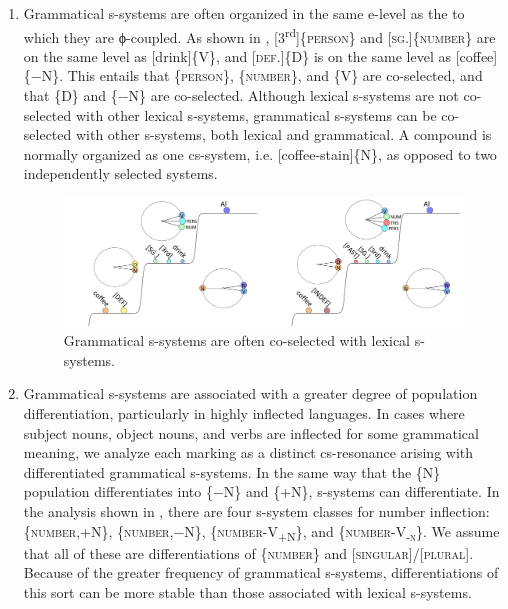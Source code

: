 \begin{enumerate}
\item Grammatical s-systems are often organized in the same e-level as the  to which they are ϕ-coupled. As shown in {}, [3\textsuperscript{rd}]\{\textsc{person}\} and [\textsc{sg.}]\{\textsc{number}\} are on the same level as [drink]\{V\}, and [\textsc{def}.]\{D\} is on the same level as [coffee]\{−N\}. This entails that \{\textsc{person}\}, \{\textsc{number}\}, and \{V\} are co-selected, and that \{D\} and \{−N\} are co-selected. Although lexical s-systems are not co-selected with other lexical s-systems, grammatical s-systems can be co-selected with other s-systems, both lexical and grammatical. A compound  is normally organized as one cs-system, i.e. [coffee-stain]\{N\}, as opposed to two independently selected systems.

  
\begin{figure}
\includegraphics[width=\textwidth]{figures/Tilsen-img66.png}
\caption{Grammatical s-systems are often co-selected with lexical s-systems.}
\label{fig:4:16}
\end{figure}
 

\item  Grammatical s-systems are associated with a greater degree of population differentiation, particularly in highly inflected languages. In cases where subject nouns, object nouns, and verbs are inflected for some grammatical meaning, we analyze each  marking as a distinct cs-resonance arising with differentiated grammatical s-systems. In the same way that the \{N\} population differentiates into \{−N\} and \{+N\},  s-systems can differentiate. In the analysis shown in {}, there are four s-system classes for number inflection: \{\textsc{number},+N\}, \{\textsc{number},−N\}, \{\textsc{number}{}-\textsc{V}\textsc{\textsubscript{+N}}\textsc{\}}, and  \{\textsc{number}{}-\textsc{V}\textsc{\textsubscript{{}-n}}\textsc{\}}. We assume that all of these are differentiations of \{\textsc{number}\} and [\textsc{singular}]/[\textsc{plural}]. Because of the greater frequency of grammatical s-systems, differentiations of this sort can be more stable than those associated with lexical s-systems. 


\end{enumerate}
